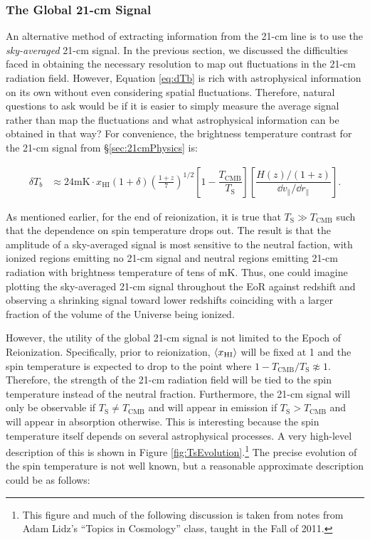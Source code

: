 \clearpage
\subsubsection{The Global 21-cm Signal}\label{sec:Global21cm}

An alternative method of extracting information from the 21-cm line is to use the \textit{sky-averaged} 21-cm signal. In the previous section, we discussed the difficulties faced in obtaining the necessary resolution to map out fluctuations in the 21-cm radiation field. However, Equation \ref{eq:dTb} is rich with astrophysical information on its own without even considering spatial fluctuations. Therefore, natural questions to ask would be if it is easier to simply measure the average signal rather than map the fluctuations and what astrophysical information can be obtained in that way? For convenience, the brightness temperature contrast for the 21-cm signal from \S \ref{sec:21cmPhysics} is:


\begin{align}
\delta T_{b} &\approx 24 \text{mK}\cdot x_{\text{HI}}(1+\delta)\left(\frac{1+z}{7}\right)^{1/2}\left[ 1 - \dfrac{T_{\text{CMB}}}{T_{\text{S}}} \right] \left[ \dfrac{H(z)/(1+z)}{\dd v_{\parallel}/ \dd r_{\parallel}} \right].
\end{align}


As mentioned earlier, for the end of reionization, it is true that $T_{\text{S}} \gg T_{\text{CMB}}$ such that the dependence on spin temperature drops out. The result is that the amplitude of a sky-averaged signal is most sensitive to the neutral faction, with ionized regions emitting no 21-cm signal and neutral regions emitting 21-cm radiation with brightness temperature of tens of mK.  Thus, one could imagine plotting the sky-averaged 21-cm signal throughout the EoR against redshift and observing a shrinking signal toward lower redshifts coinciding with a larger fraction of the volume of the Universe being ionized.


However, the utility of the global 21-cm signal is not limited to the Epoch of Reionization. Specifically, prior to reionization, $\langle x_{\text{HI}}\rangle$ will be fixed at 1 and the spin temperature is expected to drop to the point where $1 - T_{\text{CMB}}/T_{\text{S}} \not\approx 1$. Therefore, the strength of the 21-cm radiation field will be tied to the spin temperature instead of the neutral fraction. Furthermore, the 21-cm signal will only be observable if $T_{\text{S}} \neq T_{\text{CMB}}$ and will appear in emission if $T_{\text{S}} > T_{\text{CMB}}$ and will appear in absorption otherwise. This is interesting because the spin temperature itself depends on several astrophysical processes. A very high-level description of this is shown in Figure \ref{fig:TsEvolution}.\footnote{This figure and much of the following discussion is taken from notes from Adam Lidz's ``Topics in Cosmology'' class, taught in the Fall of 2011.} The precise evolution of the spin temperature is not well known, but a reasonable approximate description could be as follows:

